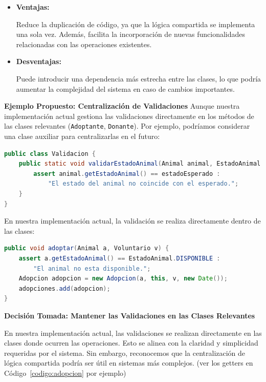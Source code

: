 \begin{itemize}
    \item \textbf{Ventajas:}\par
    Reduce la duplicación de código, ya que la lógica compartida se implementa una sola vez. 
    Además, facilita la incorporación de nuevas funcionalidades relacionadas con las 
    operaciones existentes.
    \item \textbf{Desventajas:}\par
    Puede introducir una dependencia más estrecha entre las clases, lo que podría aumentar 
    la complejidad del sistema en caso de cambios importantes.
\end{itemize}

\textbf{Ejemplo Propuesto: Centralización de Validaciones}  
Aunque nuestra implementación actual gestiona las validaciones directamente en los métodos 
de las clases relevantes (\texttt{Adoptante}, \texttt{Donante}). Por ejemplo, podríamos considerar una 
clase auxiliar para centralizarlas en el futuro:

\begin{lstlisting}[style = javaEspecifico, language=Java, caption={Clase Auxiliar para Validaciones}] 
public class Validacion {
    public static void validarEstadoAnimal(Animal animal, EstadoAnimal estadoEsperado) {
        assert animal.getEstadoAnimal() == estadoEsperado : 
            "El estado del animal no coincide con el esperado.";
    }
}
\end{lstlisting}

En nuestra implementación actual, la validación se realiza directamente dentro de las clases:

\begin{lstlisting}[style = javaEspecifico, language=Java, caption={Manejo de validaciones dentro del método Adoptar}] 
public void adoptar(Animal a, Voluntario v) {
    assert a.getEstadoAnimal() == EstadoAnimal.DISPONIBLE : 
        "El animal no esta disponible.";
    Adopcion adopcion = new Adopcion(a, this, v, new Date());
    adopciones.add(adopcion);
}
\end{lstlisting}
\vspace{0.15cm}
\textbf{Decisión Tomada: Mantener las Validaciones en las Clases Relevantes}\par
En nuestra implementación actual, las validaciones se realizan directamente en las clases 
donde ocurren las operaciones. Esto se alinea con la claridad y simplicidad requeridas por 
el sistema. Sin embargo, reconocemos que la centralización de lógica compartida podría ser 
útil en sistemas más complejos. (ver los getters en Código~\ref{codigo:adopcion} por ejemplo)



